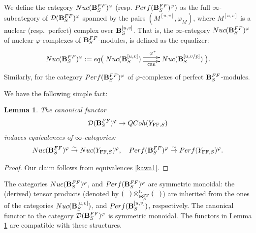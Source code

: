 \documentclass[10pt,reqno]{amsart}
\newtheorem{lemma}[equation]{Lemma}
\theoremstyle{definition}
\theoremstyle{remark}
\def\phi{\varphi}
\newcommand{\can}{ \operatorname{can} }
\newcommand{\LL}{\operatorname{L} }
\newcommand{\FF}{\operatorname{FF} }
\newcommand{\sd}{{\mathcal{D}}}
\numberwithin{equation}{section}
\numberwithin{equation}{section}
\begin{document}
  We define the category  ${\rm Nuc}(\B^{\rm FF}_{S})^{\phi}$ (resp. ${\rm Perf}(\B^{\rm FF}_{S})^{\phi})$ as the full $\infty$-subcategory of $\sd(\B^{\rm FF}_{S})^{\phi}$ spanned by
the pairs  $( M^{[u,v]},  \phi_{M })$, where $M^{[u,v]} $ is a nuclear (resp.~perfect) 
complex over ${\bf B}_{S}^{[u,v]}$. 
That is,  the $\infty$-category ${\rm Nuc}(\B^{\rm FF}_{S})^{\phi}$ of nuclear $\phi$-complexes of $\B^{\rm FF}_S$-modules, is defined as the equalizer:
$$
{\rm Nuc}(\B^{\rm FF}_{S})^{\phi}:= {\rm eq}\big( \xymatrix{{\rm Nuc}(\B_{S}^{[u,v]})\ar@<-1mm>[r]_-{\can}\ar@<1mm>[r]^{\phi^*}  &
{\rm Nuc}(\B_{S}^{[u,v/p]})}\big).
$$
Similarly, for the category ${\rm Perf}(\B^{\rm FF}_{S})^{\phi}$ of $\phi$-complexes of perfect $\B^{\rm FF}_S$-modules.
 
 We have the following simple fact:
\begin{lemma}\label{simple1}
 The canonical   functor
$$
\sd(\B^{\rm FF}_{S})^{\phi}\to {\rm QCoh}(Y_{\FF,S})
$$
 induces equivalences of $\infty$-categories:
\begin{equation}\label{mor1}
{\rm Nuc}(\B^{\rm FF}_{S})^{\phi}\stackrel{\sim}{\to} {\rm Nuc}(Y_{\FF,S})^{\phi},\quad {\rm Perf}(\B^{\rm FF}_{S})^{\phi}\stackrel{\sim}{\to }{\rm Perf}(Y_{\FF,S})^{\phi}.
\end{equation}
\end{lemma}
\begin{proof}
Our claim follows from equivalences \eqref{kawa1}. 
\end{proof}
   
    The categories   ${\rm Nuc}(\B^{\rm FF}_{S})^{\phi}$, and $ {\rm Perf}(\B^{\rm FF}_{S})^{\phi}$ are  symmetric monoidal: the (derived) tensor products 
     (denoted by $(-)\otimes^{\LL}_{\B^{\FF}_{S}}(-)$) are inherited from the ones of the 
    categories   ${\rm Nuc}(\B_{S}^{[u,v]})$, and ${\rm Perf}(\B_{S}^{[u,v]})$, respectively. The canonical functor to the category ${\sd}(\B^{\rm FF}_{S})^{\phi}$ is  symmetric monoidal. 
      The functors in Lemma \ref{simple1} are compatible with these structures. 
   
\end{document}

